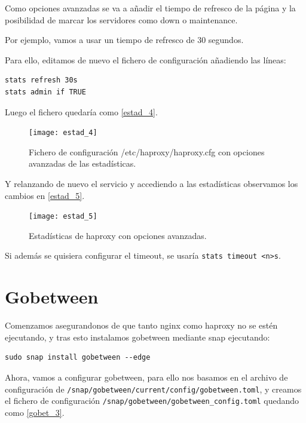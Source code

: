 Como opciones avanzadas se va a añadir el tiempo de refresco de la página y la posibilidad de marcar los servidores como down o maintenance.

Por ejemplo, vamos a usar un tiempo de refresco de 30 segundos.

Para ello, editamos de nuevo el fichero de configuración añadiendo las líneas:

\begin{verbatim}
stats refresh 30s
stats admin if TRUE
\end{verbatim}

Luego el fichero quedaría como \eqref{estad_4}.

\begin{figure}[h!]
\begin{center}
\caption{Fichero de configuración /etc/haproxy/haproxy.cfg con opciones avanzadas de las estadísticas.}
\label{estad_4}
\texttt{[image: estad\_4]}
\end{center}
\end{figure}

Y relanzando de nuevo el servicio y accediendo a las estadísticas observamos los cambios en \eqref{estad_5}.

\begin{figure}[h!]
\begin{center}
\caption{Estadísticas de haproxy con opciones avanzadas.}
\label{estad_5}
\texttt{[image: estad\_5]}
\end{center}
\end{figure}

Si además se quisiera configurar el timeout, se usaría \verb|stats timeout <n>s|.

\chapter{Gobetween}

Comenzamos asegurandonos de que tanto nginx como haproxy no se estén ejecutando, y tras esto instalamos gobetween mediante snap ejecutando:

\begin{verbatim}
sudo snap install gobetween --edge
\end{verbatim}

Ahora, vamos a configurar gobetween, para ello nos basamos en el archivo de configuración de \verb|/snap/gobetween/current/config/gobetween.toml|, y creamos el fichero de configuración \verb|/snap/gobetween/gobetween_config.toml| quedando como \eqref{gobet_3}.

